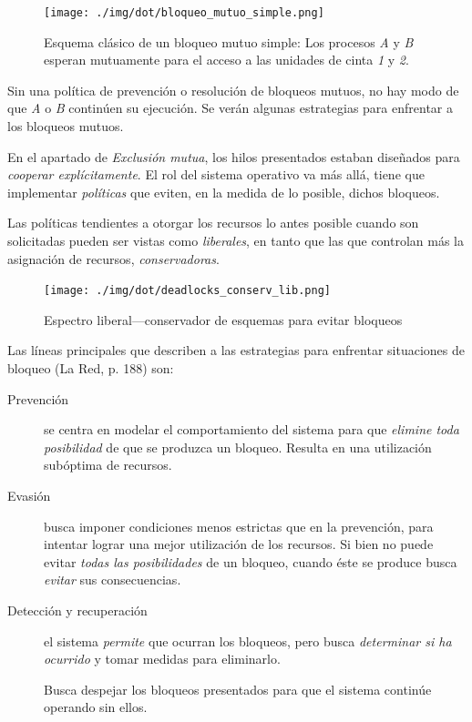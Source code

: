 \documentclass[11pt,fleqn]{book} %
\begin{document}
\begin{figure}[htb]
\centering
\texttt{[image: ./img/dot/bloqueo\_mutuo\_simple.png]}
\caption{\label{PROC_bloqueo_mutuo_simple}Esquema clásico de un bloqueo mutuo simple: Los procesos \emph{A} y \emph{B} esperan mutuamente para el acceso a las unidades de cinta \emph{1} y \emph{2}.}
\end{figure}

Sin una política de prevención o resolución de bloqueos mutuos, no hay
modo de que \emph{A} o \emph{B} continúen su ejecución. Se verán algunas
estrategias para enfrentar a los bloqueos mutuos.

En el apartado de \emph{Exclusión mutua}, los hilos presentados estaban
diseñados para \emph{cooperar explícitamente}. El rol del sistema operativo
va más allá, tiene que implementar \emph{políticas} que eviten, en la
medida de lo posible, dichos bloqueos.

Las políticas tendientes a otorgar los recursos lo antes posible
cuando son solicitadas pueden ser vistas como \emph{liberales}, en tanto
que las que controlan más la asignación de recursos,
\emph{conservadoras}.

\begin{figure}[htb]
\centering
\texttt{[image: ./img/dot/deadlocks\_conserv\_lib.png]}
\caption{\label{PROC_deadlocks_conserv_lib}Espectro liberal—conservador de esquemas para evitar bloqueos}
\end{figure}

Las líneas principales que describen a las estrategias para enfrentar
situaciones de bloqueo (La Red, p. 188) son:

\begin{description}
\item[Prevención] se centra en modelar el comportamiento del sistema
		para que \emph{elimine toda posibilidad} de que se produzca
		un bloqueo. Resulta en una utilización subóptima de
		recursos.
\item[Evasión] busca imponer condiciones menos estrictas que en la
	     prevención, para intentar lograr una mejor utilización de
	     los recursos. Si bien no puede evitar \emph{todas las 	     posibilidades} de un bloqueo, cuando éste se produce
	     busca \emph{evitar} sus consecuencias.
\item[Detección y recuperación] el sistema \emph{permite} que ocurran los
     bloqueos, pero busca \emph{determinar si ha ocurrido} y tomar medidas
     para eliminarlo.

     Busca despejar los bloqueos presentados para que el sistema
     continúe operando sin ellos.
\end{description}
\end{document}
